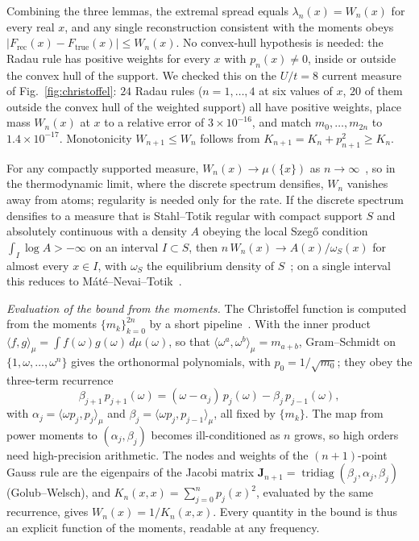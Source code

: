 \documentclass[aps,prb,onecolumn,superscriptaddress,longbibliography,floatfix]{revtex4-2}
\begin{document}
Combining the three lemmas, the extremal spread equals $\lambda_n(x)=W_n(x)$ for every real $x$, and any single reconstruction consistent with the moments obeys $|F_{\mathrm{rec}}(x)-F_{\mathrm{true}}(x)|\le W_n(x)$. No convex-hull hypothesis is needed: the Radau rule has positive weights for every $x$ with ${p_n(x)\neq0}$, inside or outside the convex hull of the support. We checked this on the $U/t=8$ current measure of Fig.~\ref{fig:christoffel}: $24$ Radau rules ($n=1,\dots,4$ at six values of $x$, $20$ of them outside the convex hull of the weighted support) all have positive weights, place mass $W_n(x)$ at $x$ to a relative error of $3\times10^{-16}$, and match $m_0,\dots,m_{2n}$ to $1.4\times10^{-17}$. Monotonicity $W_{n+1}\le W_n$ follows from $K_{n+1}=K_n+p_{n+1}^2\ge K_n$.

For any compactly supported measure, $W_n(x)\to\mu(\{x\})$ as $n\to\infty$~\cite{ShohatTamarkin1943,Nevai1986}, so in the thermodynamic limit, where the discrete spectrum densifies, $W_n$ vanishes away from atoms; regularity is needed only for the rate. If the discrete spectrum densifies to a measure that is Stahl--Totik regular with compact support $S$ and absolutely continuous with a density $A$ obeying the local Szeg\H{o} condition $\int_I\log A>-\infty$ on an interval $I\subset S$, then $n\,W_n(x)\to A(x)/\omega_S(x)$ for almost every $x\in I$, with $\omega_S$ the equilibrium density of $S$~\cite{Totik2000}; on a single interval this reduces to M\'at\'e--Nevai--Totik~\cite{MNT1991}.

\medskip
\noindent\emph{Evaluation of the bound from the moments.}\label{app:evaluate}\enspace
The Christoffel function is computed from the moments $\{m_k\}_{k=0}^{2n}$ by a short pipeline~\cite{GolubWelsch1969,GM2010}. With the inner product $\langle f,g\rangle_\mu=\int f(\omega)g(\omega)\,d\mu(\omega)$, so that $\langle\omega^a,\omega^b\rangle_\mu=m_{a+b}$, Gram--Schmidt on $\{1,\omega,\dots,\omega^n\}$ gives the orthonormal polynomials, with $p_0=1/\sqrt{m_0}$; they obey the three-term recurrence
\begin{equation}
\beta_{j+1}\,p_{j+1}(\omega)=(\omega-\alpha_j)\,p_j(\omega)-\beta_j\,p_{j-1}(\omega),
\label{eq:app-recur}
\end{equation}
with $\alpha_j=\langle\omega p_j,p_j\rangle_\mu$ and $\beta_j=\langle\omega p_j,p_{j-1}\rangle_\mu$, all fixed by $\{m_k\}$. The map from power moments to $(\alpha_j,\beta_j)$ becomes ill-conditioned as $n$ grows, so high orders need high-precision arithmetic. The nodes and weights of the $(n{+}1)$-point Gauss rule are the eigenpairs of the Jacobi matrix $\mathbf{J}_{n+1}=\operatorname{tridiag}(\beta_j,\alpha_j,\beta_j)$ (Golub--Welsch), and $K_n(x,x)=\sum_{j=0}^{n}p_j(x)^2$, evaluated by the same recurrence, gives $W_n(x)=1/K_n(x,x)$. Every quantity in the bound is thus an explicit function of the moments, readable at any frequency.
\end{document}
